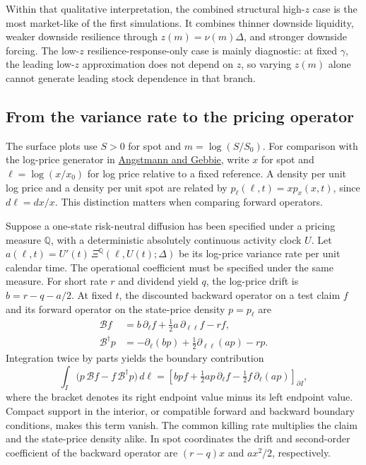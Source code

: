 \documentclass[11pt]{article}
\begin{document}
Within that qualitative interpretation, the combined structural high-\(z\)
case is the most market-like of the first simulations. It combines thinner
downside liquidity, weaker downside resilience through \(z(m)=\nu(m)\Delta\),
and stronger downside forcing. The low-\(z\) resilience-response-only case is
mainly diagnostic: at fixed \(\gamma\), the leading low-\(z\) approximation
does not depend on \(z\), so varying \(z(m)\) alone cannot generate leading
stock dependence in that branch.

\subsection{From the variance rate to the pricing operator}
The surface plots use \(S>0\) for spot and \(m=\log(S/S_0)\).
For comparison with the log-price generator in
\href{https://arxiv.org/abs/2607.05011v4}{Angstmann and Gebbie},
write \(x\) for spot and \(\ell=\log(x/x_0)\) for log price relative
to a fixed reference. A density per unit log price and a density per unit
spot are related by \(p_\ell(\ell,t)=x p_x(x,t)\), since
\(d\ell=dx/x\). This distinction matters when comparing forward operators.

Suppose a one-state risk-neutral diffusion has been specified under a
pricing measure \(\mathbb Q\), with a deterministic absolutely continuous
activity clock \(U\). Let
\(a(\ell,t)=U'(t)\,\Xi^{\mathbb Q}(\ell,U(t);\Delta)\) be its
log-price variance rate per unit calendar time. The operational coefficient
must be specified under the same measure. For short rate \(r\) and
dividend yield \(q\), the log-price drift is \(b=r-q-a/2\). At fixed
\(t\), the discounted backward operator on a test claim \(f\) and its
forward operator on the state-price density \(p=p_\ell\) are
\begin{align}
 \mathcal B f &= b\,\partial_\ell f
       +\tfrac12 a\,\partial_{\ell\ell} f-rf,\nonumber\\
 \mathcal B^\dagger p &= -\partial_\ell(bp)
       +\tfrac12\partial_{\ell\ell}(ap)-rp .
 \label{eq:log-price-adjoint}
\end{align}
Integration twice by parts yields the boundary contribution
\begin{equation}
 \int_I \bigl(p\,\mathcal B f-f\,\mathcal B^\dagger p\bigr)\,d\ell
 =\left[bpf+\tfrac12 ap\,\partial_\ell f
                -\tfrac12 f\,\partial_\ell(ap)\right]_{\partial I},
 \label{eq:log-price-boundary}
\end{equation}
where the bracket denotes its right endpoint value minus its left
endpoint value. Compact support in the interior, or compatible forward
and backward boundary conditions, makes this term vanish. The common
killing rate multiplies the claim and the state-price density alike.
In spot coordinates the drift and second-order coefficient of the
backward operator are \((r-q)x\) and \(a x^2/2\), respectively.
\end{document}
